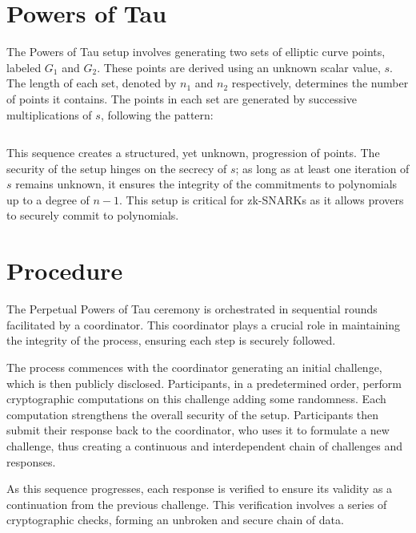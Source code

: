 \documentclass[11pt]{article}
\begin{document}
\section{Powers of Tau}
\label{sec:org0ee9a14}

The Powers of Tau setup involves generating two sets of elliptic curve points, labeled \(G_1\) and \(G_2\). These points are derived using an unknown scalar value, \(s\). The length of each set, denoted by \(n_1\) and \(n_2\) respectively, determines the number of points it contains. The points in each set are generated by successive multiplications of \(s\), following the pattern:

\begin{equation}
[G_1,G_1*s,G_1*s^2...G_1*s^{n_1-1}] \nonumber
\end{equation}
\begin{equation}
[G_2,G_2*s,G_2*s^2...G_2*s^{n_2-1}]  \nonumber
\end{equation}

This sequence creates a structured, yet unknown, progression of points. The security of the setup hinges on the secrecy of \(s\); as long as at least one iteration of \(s\) remains unknown, it ensures the integrity of the commitments to polynomials up to a degree of \(n-1\). This setup is critical for zk-SNARKs as it allows provers to securely commit to polynomials.
\section{Procedure}
\label{sec:orgad166f0}

The Perpetual Powers of Tau ceremony is orchestrated in sequential rounds facilitated by a coordinator. This coordinator plays a crucial role in maintaining the integrity of the process, ensuring each step is securely followed.

The process commences with the coordinator generating an initial challenge, which is then publicly disclosed. Participants, in a predetermined order, perform cryptographic computations on this challenge adding some randomness. Each computation strengthens the overall security of the setup. Participants then submit their response back to the coordinator, who uses it to formulate a new challenge, thus creating a continuous and interdependent chain of challenges and responses.

As this sequence progresses, each response is verified to ensure its validity as a continuation from the previous challenge. This verification involves a series of cryptographic checks, forming an unbroken and secure chain of data.
\end{document}

